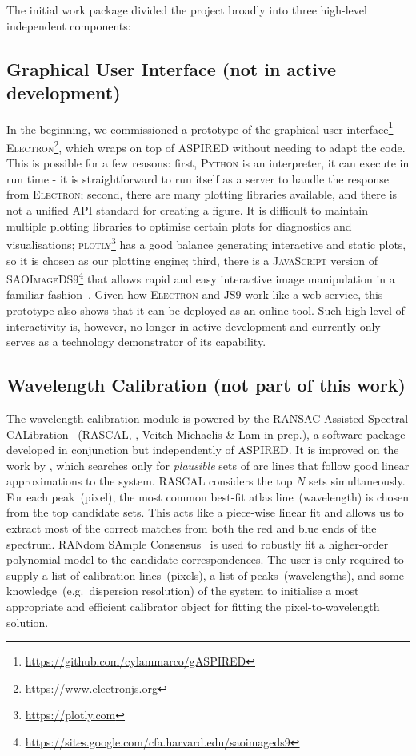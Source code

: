 \documentclass[fleqn,usenatbib]{mnras}
\begin{document}
The initial
work package divided the project broadly into three high-level independent
components:

\subsection*{Graphical User Interface (not in active development)}
In the beginning, we commissioned a prototype of the graphical user
interface\footnote{\url{https://github.com/cylammarco/gASPIRED}}
\textsc{Electron}\footnote{\url{https://www.electronjs.org}}, which wraps on top of
\textsc{ASPIRED} without needing to adapt the code. This is
possible for a few reasons: first, \textsc{Python} is an interpreter, it can execute
in run time - it is straightforward to run itself as a server to handle the response from 
\textsc{Electron}; second, there are many plotting libraries available, and there is
not a unified API standard for creating a figure. It is difficult to maintain
multiple plotting libraries to optimise certain plots for diagnostics and
visualisations; \textsc{plotly}\footnote{\url{https://plotly.com}} has a good balance
generating interactive and static plots, so it is chosen as our plotting engine; third,
there is a \textsc{JavaScript} version of
\textsc{SAOImageDS9}\footnote{\url{https://sites.google.com/cfa.harvard.edu/saoimageds9}}
that allows rapid and easy interactive image manipulation in a familiar
fashion~\citep{eric_mandel_2021_596052}. Given how \textsc{Electron} and
\textsc{JS9} work like a web service, this prototype also shows that it can 
be deployed as an online tool. Such high-level of interactivity is, however, no longer
in active development and currently only serves as a technology demonstrator of its capability.

\subsection*{Wavelength Calibration (not part of this work)}
The wavelength calibration module is powered by the RANSAC Assisted Spectral CALibration
~(\textsc{RASCAL}, \citealt{2020zndo...4117517V, 2020ASPC..527..627V}, Veitch-Michaelis
\& Lam in prep.), a software package developed in conjunction but independently of \textsc{ASPIRED}.
It is improved on the work by \citet{2018ApOpt..57.6876S}, which searches only for
\textit{plausible} sets of arc lines that follow good linear approximations to the
system. \textsc{RASCAL} considers the top $N$ sets simultaneously. For each peak~(pixel),
the most common best-fit atlas line~(wavelength) is chosen from the top candidate
sets. This acts like a piece-wise linear fit and allows us to extract most of
the correct matches from both the red and blue ends of the spectrum. RANdom
SAmple Consensus~\citep[RANSAC,][]{fischler_bolles_1981} is used to robustly
fit a higher-order polynomial model to the candidate correspondences. The user
is only required to supply a list of calibration lines~(pixels), a
list of peaks~(wavelengths), and some knowledge~(e.g.\ dispersion resolution) of
the system to initialise a most appropriate and efficient calibrator object for
fitting the pixel-to-wavelength solution.
\end{document}
